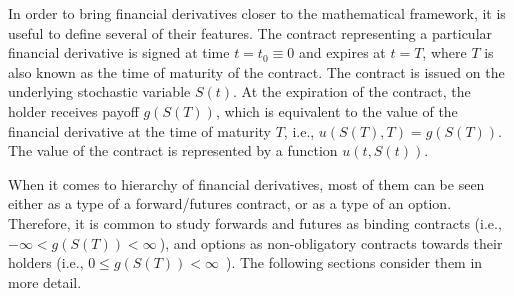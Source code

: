 \documentclass{UUThesisTemplate}
\begin{document}
\par In order to bring financial derivatives closer to the mathematical framework, it is useful to define several of their features. The contract representing a particular financial derivative is signed at time $t=t_0\equiv0$ and expires at $t=T$, where $T$ is also known as the time of maturity of the contract. The contract is issued on the underlying stochastic variable $S(t)$. At the expiration of the contract, the holder receives payoff $g(S(T))$, which is equivalent to the value of the financial derivative at the time of maturity $T$, i.e., $u(S(T),T) = g(S(T))$. The value of the contract is represented by a function $u(t,S(t))$.
\par When it comes to hierarchy of financial derivatives, most of them can be seen either as a type of a forward/futures contract, or as a type of an option. Therefore, it is common to study forwards and futures as binding contracts (i.e., $-\infty < g(S(T)) < \infty\ $), and options as non-obligatory contracts towards their holders (i.e., $0\leq g(S(T))<\infty$\ ). The following sections consider them in more detail.
%
\end{document}
